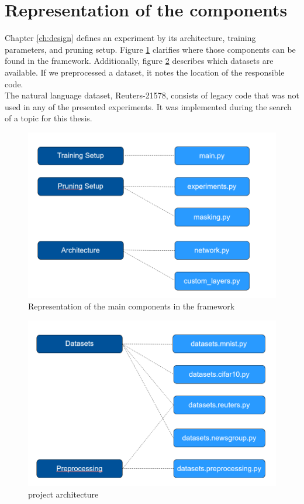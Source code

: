\section{Representation of the components}
Chapter \ref{ch:design} defines an experiment by its architecture, training parameters, and pruning setup. Figure \ref{fig:Setup Representation} clarifies where those components can be found in the framework. 
Additionally, figure \ref{fig:Dataset Representation} describes which datasets are available. If we preprocessed a dataset, it notes the location of the responsible code.\\
The natural language dataset, Reuters-21578, consists of legacy code that was not used in any of the presented experiments. It was implemented during the search of a topic for this thesis.
\begin{figure}
	\centering
	\includegraphics[width=450px]{gfx/chp_5_setups.png}
	\caption{Representation of the main components in the framework}
	\label{fig:Setup Representation}
\end{figure}
\begin{figure}
	\centering
	\includegraphics[width=450px]{gfx/chp_5_datasets.png}
	\caption{project architecture}
	\label{fig:Dataset Representation}
\end{figure}

